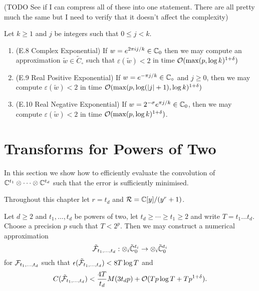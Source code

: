 (TODO See if I can compress all of these into one statement. There are all pretty much the same but I need to verify that it doesn't affect the complexity)

\begin{lemma}
    Let $k \ge 1$ and $j$ be integers such that $0 \le j < k$.
    \begin{enumerate}
        \item (E.8 Complex Exponential) If $w = e^{2\pi i j / k} \in {\mathbb C}_0$ then we may compute an approximation $\tilde{w} \in \tilde{C}_\circ$ such that $\varepsilon(\tilde{w}) < 2$ in time $\mathcal O(\max(p, \log k)^{1 + \delta})$
        \item (E.9 Real Positive Exponential) If $w = e^{-\pi j / k} \in {\mathbb C}_\circ$ and $j \ge 0$, then we may compute $\varepsilon(\tilde{w}) < 2$ in time $\mathcal O(\max(p, \log (|j| + 1), \log k)^{1 + \delta})$
        \item (E.10 Real Negative Exponential) If $w = 2^{- \sigma} e^{\pi j / k} \in {\mathbb C}_0$, then we may compute $\varepsilon(\tilde{w}) < 2$ in time $\mathcal O(\max(p, \log k)^{1 + \delta})$.
    \end{enumerate}
\end{lemma}

\section{Transforms for Powers of Two}
\label{sec:transfoms-for-powers-of-two}

In this section we show how to efficiently evaluate the convolution of ${\mathbb C}^{t_1} \otimes \cdots \otimes {\mathbb C}^{t_d}$ such that the error is sufficiently minimised.

Throughout this chapter let $r = t_d$ and $\mathcal R = {\mathbb C}[y] / (y^r + 1)$.

\begin{theorem}\label{thm:main-3}
    Let $d \geq 2$ and $t_1, \ldots, t_d$ be powers of two, let $t_d \geq \cdots \geq t_1 \geq 2$ and write $T = t_1 \ldots t_d$. Choose a precision $p$ such that $T < 2^p$. Then we may construct a numerical approximation
    \[
        \tilde {\mathcal F}_{t_1, \ldots, t_d} : \otimes_i \tilde{{\mathbb C}}^{t_i}_0 \to \otimes_i \tilde{{\mathbb C}}^{t_i}_0
    \]
    for $\mathcal F_{t_1, \ldots, t_d}$ such that $\epsilon(\tilde{\mathcal F}_{t_1, \ldots, t_d}) < 8 T \log T$ and
    \[
        C(\tilde{\mathcal F}_{t_1, \ldots, t_d}) < \frac{4T}{t_d} M(3t_d p) + \mathcal O(Tp\log T + Tp^{1 + \delta}).
    \]
\end{theorem}

